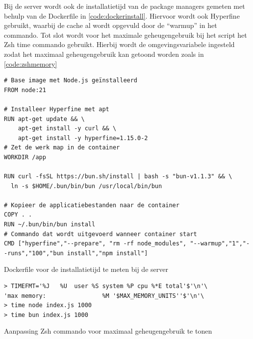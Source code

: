 Bij de server wordt ook de installatietijd van de package managers gemeten met behulp van de Dockerfile in \ref{code:dockerinstall}.
Hiervoor wordt ook Hyperfine gebruikt, waarbij de cache al wordt opgevuld door de “warmup” in het commando.
Tot slot wordt voor het maximale geheugengebruik bij het script het Zsh time commando gebruikt. Hierbij wordt de omgevingsvariabele 
ingesteld zodat het maximaal geheugengebruik kan getoond worden zoals in \ref{code:zshmemory}
\begin{listing}[H]
  \centering
  \begin{verbatim}
# Base image met Node.js geïnstalleerd
FROM node:21

# Installeer Hyperfine met apt
RUN apt-get update && \
    apt-get install -y curl && \
    apt-get install -y hyperfine=1.15.0-2
# Zet de werk map in de container
WORKDIR /app

RUN curl -fsSL https://bun.sh/install | bash -s "bun-v1.1.3" && \
  ln -s $HOME/.bun/bin/bun /usr/local/bin/bun

# Kopieer de applicatiebestanden naar de container
COPY . .
RUN ~/.bun/bin/bun install
# Commando dat wordt uitgevoerd wanneer container start
CMD ["hyperfine","--prepare", "rm -rf node_modules", "--warmup","1","--runs","100","bun install","npm install"]
      \end{verbatim}
      \caption[Dockerfile meting installatietijd]{\label{code:dockerinstall}Dockerfile voor de installatietijd te meten bij de server}
\end{listing}

\begin{listing}[H]
  \centering
  \begin{verbatim}
> TIMEFMT='%J   %U  user %S system %P cpu %*E total'$'\n'\
'max memory:                %M '$MAX_MEMORY_UNITS''$'\n'\
> time node index.js 1000
> time bun index.js 1000
      \end{verbatim}
      \caption[Zsh time commando]{\label{code:zshmemory}Aanpassing Zsh commando voor maximaal geheugengebruik te tonen}
\end{listing}

